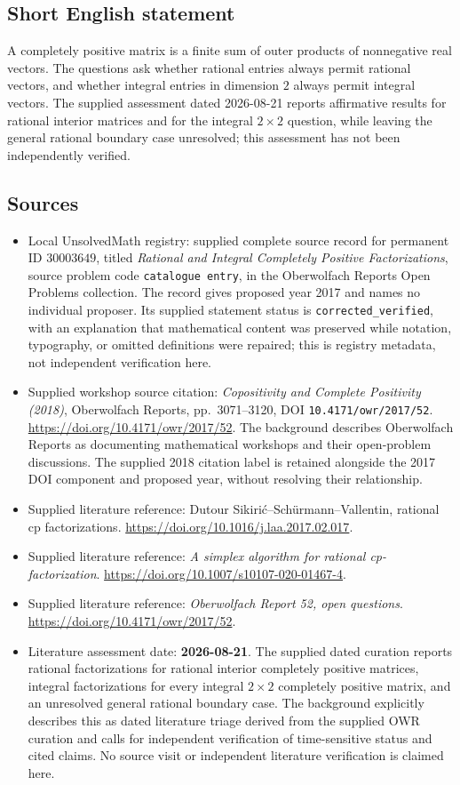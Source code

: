 \documentclass[11pt]{article}
\begin{document}
\subsection{Short English statement}
A completely positive matrix is a finite sum of outer products of nonnegative real vectors. The questions ask whether rational entries always permit rational vectors, and whether integral entries in dimension \(2\) always permit integral vectors. The supplied assessment dated 2026-08-21 reports affirmative results for rational interior matrices and for the integral \(2\times 2\) question, while leaving the general rational boundary case unresolved; this assessment has not been independently verified.
\subsection{Sources}
\begin{itemize}
\item Local UnsolvedMath registry: supplied complete source record for permanent ID \(30003649\), titled \emph{Rational and Integral Completely Positive Factorizations}, source problem code \texttt{catalogue entry}, in the Oberwolfach Reports Open Problems collection. The record gives proposed year 2017 and names no individual proposer. Its supplied statement status is \texttt{corrected\_verified}, with an explanation that mathematical content was preserved while notation, typography, or omitted definitions were repaired; this is registry metadata, not independent verification here.
\item Supplied workshop source citation: \emph{Copositivity and Complete Positivity (2018)}, Oberwolfach Reports, pp.\ 3071--3120, DOI \texttt{10.4171/owr/2017/52}. \url{https://doi.org/10.4171/owr/2017/52}. The background describes Oberwolfach Reports as documenting mathematical workshops and their open-problem discussions. The supplied 2018 citation label is retained alongside the 2017 DOI component and proposed year, without resolving their relationship.
\item Supplied literature reference: Dutour Sikirić--Schürmann--Vallentin, rational cp factorizations. \url{https://doi.org/10.1016/j.laa.2017.02.017}.
\item Supplied literature reference: \emph{A simplex algorithm for rational cp-factorization}. \url{https://doi.org/10.1007/s10107-020-01467-4}.
\item Supplied literature reference: \emph{Oberwolfach Report 52, open questions}. \url{https://doi.org/10.4171/owr/2017/52}.
\item Literature assessment date: \textbf{2026-08-21}. The supplied dated curation reports rational factorizations for rational interior completely positive matrices, integral factorizations for every integral \(2\times 2\) completely positive matrix, and an unresolved general rational boundary case. The background explicitly describes this as dated literature triage derived from the supplied OWR curation and calls for independent verification of time-sensitive status and cited claims. No source visit or independent literature verification is claimed here.
\end{itemize}
\end{document}
